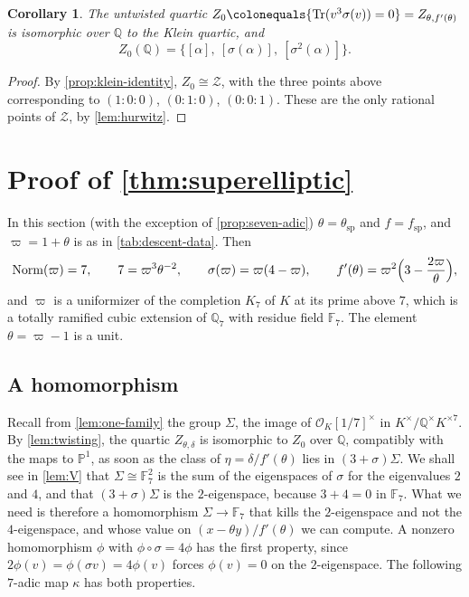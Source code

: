 \documentclass[12pt]{amsart}
\newcommand{\F}{{\mathbb F}}
\renewcommand{\P}{\mathbb{P}}
\newcommand{\Q}{\mathbb{Q}}
\newcommand{\Pone}{\P^{1}}
\newcommand{\calZ}{{\mathcal Z}}
\newcommand{\OO}{{\mathcal O}}
\DeclareMathOperator{\spc}{sp}
\DeclareMathOperator{\Norm}{Norm}
\DeclareMathOperator{\Tr}{Tr}
\newcommand{\cdef}[1]{{\color{blue} \textsf{#1}}} %
\numberwithin{equation}{section}
\newtheorem{corollary}[theorem]{Corollary}
\theoremstyle{definition}
\begin{document}
\begin{corollary}
  \label{cor:Z0}
  The \cdef{untwisted quartic}
  $Z_0 \colonequals \{\Tr(v^{3}\sigma(v)) = 0\} = Z_{\theta,f'(\theta)}$
  is isomorphic over $\Q$ to the Klein quartic, and
  \[
    Z_0(\Q) = \bigl\{[\alpha],\ [\sigma(\alpha)],\ [\sigma^{2}(\alpha)]\bigr\}.
  \]
\end{corollary}
\begin{proof}
  By \cref{prop:klein-identity}, $Z_0 \cong \calZ$, with the three points
  above corresponding to $(1:0:0)$, $(0:1:0)$, $(0:0:1)$. These are the only
  rational points of $\calZ$, by \cref{lem:hurwitz}.
\end{proof}

\section{Proof of \texorpdfstring{\cref{thm:superelliptic}}{Theorem 1}}
\label{sec:proof-thm-1}

In this section (with the exception of \cref{prop:seven-adic})
$\theta = \theta_{\spc}$ and $f = f_{\spc}$, and $\varpi = 1 + \theta$ is as in
\cref{tab:descent-data}. Then
\begin{equation}
  \label{eq:varpi}
  \Norm(\varpi) = 7, \qquad 7 = \varpi^{3}\theta^{-2}, \qquad
  \sigma(\varpi) = \varpi(4 - \varpi), \qquad
  f'(\theta) = \varpi^{2}\Bigl(3 - \frac{2\varpi}{\theta}\Bigr),
\end{equation}
and $\varpi$ is a uniformizer of the completion $K_7$ of $K$ at its prime above
$7$, which is a totally ramified cubic extension of $\Q_7$ with residue field
$\F_7$. The element $\theta = \varpi - 1$ is a unit.

\subsection{A homomorphism}
Recall from \cref{lem:one-family} the group $\Sigma$, the image of
$\OO_K[1/7]^{\times}$ in $K^{\times}/\Q^{\times}K^{\times 7}$. By
\cref{lem:twisting}, the quartic $Z_{\theta,\delta}$ is isomorphic to $Z_0$
over $\Q$, compatibly with the maps to $\Pone$, as soon as the class of
$\eta = \delta/f'(\theta)$ lies in $(3+\sigma)\Sigma$. We shall see in
\cref{lem:V} that $\Sigma \cong \F_7^{2}$ is the sum of the eigenspaces of
$\sigma$ for the eigenvalues $2$ and $4$, and that $(3+\sigma)\Sigma$ is the
$2$-eigenspace, because $3 + 4 = 0$ in $\F_7$. What we need is therefore a
homomorphism $\Sigma \to \F_7$ that kills the $2$-eigenspace and not the
$4$-eigenspace, and whose value on $(x - \theta y)/f'(\theta)$ we can compute.
A nonzero homomorphism $\phi$ with $\phi \circ \sigma = 4\phi$ has the first
property, since $2\phi(v) = \phi(\sigma v) = 4\phi(v)$ forces $\phi(v) = 0$ on
the $2$-eigenspace. The following $7$-adic map $\kappa$ has both properties.
\end{document}
